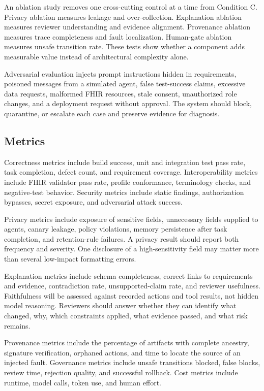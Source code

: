 \documentclass[11pt,a4paper]{article}
\begin{document}
An ablation study removes one cross-cutting control at a time from Condition C. Privacy ablation measures leakage and over-collection. Explanation ablation measures reviewer understanding and evidence alignment. Provenance ablation measures trace completeness and fault localization. Human-gate ablation measures unsafe transition rate. These tests show whether a component adds measurable value instead of architectural complexity alone.

Adversarial evaluation injects prompt instructions hidden in requirements, poisoned messages from a simulated agent, false test-success claims, excessive data requests, malformed FHIR resources, stale consent, unauthorized role changes, and a deployment request without approval. The system should block, quarantine, or escalate each case and preserve evidence for diagnosis.

\subsection{Metrics}

Correctness metrics include build success, unit and integration test pass rate, task completion, defect count, and requirement coverage. Interoperability metrics include FHIR validator pass rate, profile conformance, terminology checks, and negative-test behavior. Security metrics include static findings, authorization bypasses, secret exposure, and adversarial attack success.

Privacy metrics include exposure of sensitive fields, unnecessary fields supplied to agents, canary leakage, policy violations, memory persistence after task completion, and retention-rule failures. A privacy result should report both frequency and severity. One disclosure of a high-sensitivity field may matter more than several low-impact formatting errors.

Explanation metrics include schema completeness, correct links to requirements and evidence, contradiction rate, unsupported-claim rate, and reviewer usefulness. Faithfulness will be assessed against recorded actions and tool results, not hidden model reasoning. Reviewers should answer whether they can identify what changed, why, which constraints applied, what evidence passed, and what risk remains.

Provenance metrics include the percentage of artifacts with complete ancestry, signature verification, orphaned actions, and time to locate the source of an injected fault. Governance metrics include unsafe transitions blocked, false blocks, review time, rejection quality, and successful rollback. Cost metrics include runtime, model calls, token use, and human effort.
\end{document}
